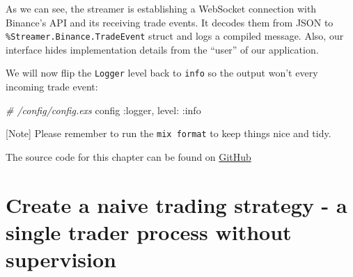 \documentclass[
  oneside]{book}
\newenvironment{Shaded}{\begin{snugshade}}{\end{snugshade}}
\newcommand{\AttributeTok}[1]{\textcolor[rgb]{0.13,0.29,0.53}{#1}}
\newcommand{\CommentTok}[1]{\textcolor[rgb]{0.56,0.35,0.01}{\textit{#1}}}
\newcommand{\ErrorTok}[1]{\textcolor[rgb]{0.64,0.00,0.00}{\textbf{#1}}}
\newcommand{\ExtensionTok}[1]{#1}
\newcommand{\KeywordTok}[1]{\textcolor[rgb]{0.13,0.29,0.53}{\textbf{#1}}}
\newcommand{\NormalTok}[1]{#1}
\newcommand{\OperatorTok}[1]{\textcolor[rgb]{0.81,0.36,0.00}{\textbf{#1}}}
\newcommand{\PreprocessorTok}[1]{\textcolor[rgb]{0.56,0.35,0.01}{\textit{#1}}}
\newcommand{\SpecialStringTok}[1]{\textcolor[rgb]{0.31,0.60,0.02}{#1}}
\newcommand{\StringTok}[1]{\textcolor[rgb]{0.31,0.60,0.02}{#1}}
\newcommand{\VariableTok}[1]{\textcolor[rgb]{0.00,0.00,0.00}{#1}}
\begin{document}
\begin{Shaded}
\end{Shaded}

As we can see, the streamer is establishing a WebSocket connection with Binance's API and its receiving trade events. It decodes them from JSON to \texttt{\%Streamer.Binance.TradeEvent} struct and logs a compiled message. Also, our interface hides implementation details from the ``user'' of our application.

We will now flip the \texttt{Logger} level back to \texttt{info} so the output won't every incoming trade event:

\begin{Shaded}
\begin{Highlighting}[]
\CommentTok{\# /config/config.exs}
\NormalTok{config }\VariableTok{:logger}\NormalTok{,}
  \VariableTok{level:} \VariableTok{:info}
\end{Highlighting}
\end{Shaded}

{[}Note{]} Please remember to run the \texttt{mix\ format} to keep things nice and tidy.

The source code for this chapter can be found on \href{https://github.com/Cinderella-Man/hands-on-elixir-and-otp-cryptocurrency-trading-bot-source-code/tree/chapter_01}{GitHub}

\chapter{Create a naive trading strategy - a single trader process without supervision}\label{create-a-naive-trading-strategy---a-single-trader-process-without-supervision}
\end{document}
